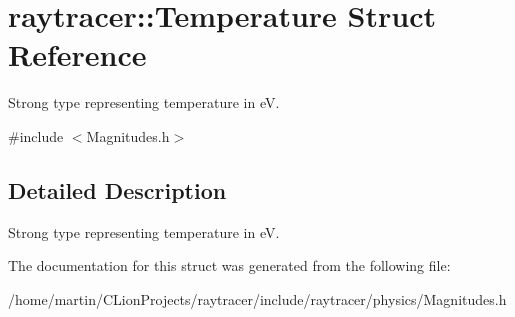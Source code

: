 \hypertarget{structraytracer_1_1Temperature}{}\section{raytracer\+:\+:Temperature Struct Reference}
\label{structraytracer_1_1Temperature}


Strong type representing temperature in eV.  




{\ttfamily \#include $<$Magnitudes.\+h$>$}



\subsection{Detailed Description}
Strong type representing temperature in eV. 



The documentation for this struct was generated from the following file\+:\begin{DoxyCompactItemize}
\item 
/home/martin/\+C\+Lion\+Projects/raytracer/include/raytracer/physics/Magnitudes.\+h\end{DoxyCompactItemize}

